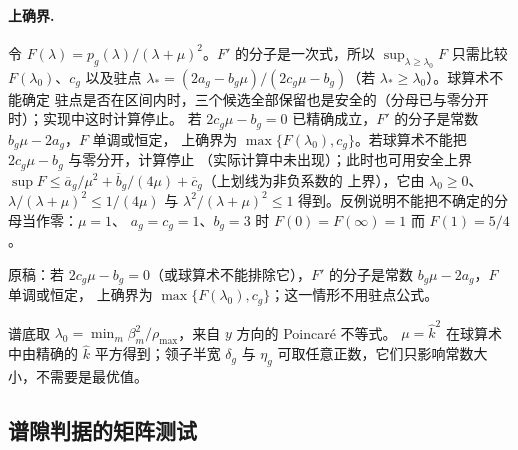 \paragraph{上确界.}
令 $F(\lambda)=p_g(\lambda)/(\lambda+\mu)^2$。$F'$ 的分子是一次式，所以
$\sup_{\lambda\geq\lambda_0}F$ 只需比较 $F(\lambda_0)$、$c_g$ 以及驻点
$\lambda_*=(2a_g-b_g\mu)/(2c_g\mu-b_g)$（若 $\lambda_*\geq\lambda_0$）。球算术不能确定
驻点是否在区间内时，三个候选全部保留也是安全的（分母已与零分开时）；实现中这时计算停止。
若 $2c_g\mu-b_g=0$ 已精确成立，$F'$ 的分子是常数 $b_g\mu-2a_g$，$F$ 单调或恒定，
上确界为 $\max\{F(\lambda_0),c_g\}$。若球算术不能把 $2c_g\mu-b_g$ 与零分开，计算停止
（实际计算中未出现）；此时也可用安全上界
$\sup F\leq\overline a_g/\mu^2+\overline b_g/(4\mu)+\overline c_g$（上划线为非负系数的
上界），它由 $\lambda_0\geq0$、$\lambda/(\lambda+\mu)^2\leq1/(4\mu)$ 与
$\lambda^2/(\lambda+\mu)^2\leq1$ 得到。反例说明不能把不确定的分母当作零：$\mu=1$、
$a_g=c_g=1$、$b_g=3$ 时 $F(0)=F(\infty)=1$ 而 $F(1)=5/4$。
\begin{workonly}
原稿：若 $2c_g\mu-b_g=0$（或球算术不能排除它），$F'$ 的分子是常数 $b_g\mu-2a_g$，$F$ 单调或恒定，
上确界为 $\max\{F(\lambda_0),c_g\}$；这一情形不用驻点公式。
\end{workonly}
谱底取
$\lambda_0=\min_m\beta_m^2/\rho_{\max}$，来自 $y$ 方向的 Poincaré 不等式。
$\mu=\widehat k^2$ 在球算术中由精确的 $\widehat k$ 平方得到；领子半宽 $\delta_g$ 与
$\eta_g$ 可取任意正数，它们只影响常数大小，不需要是最优值。

\subsection{谱隙判据的矩阵测试}
\label{app:reliable-band}


